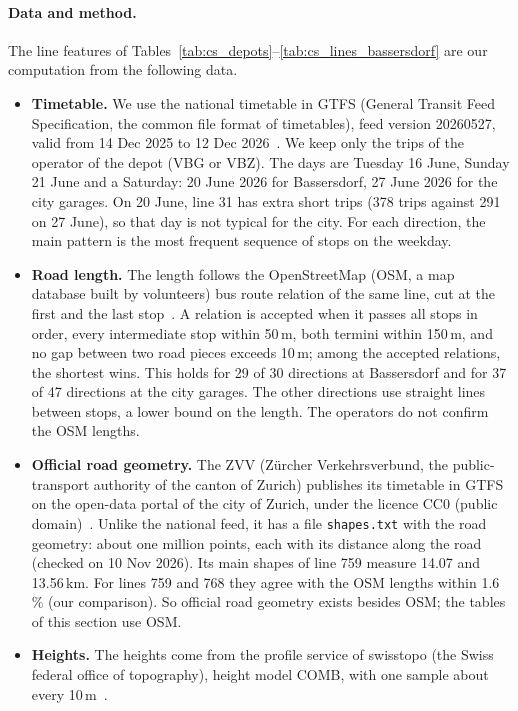 \documentclass[11pt,a4paper]{article}
\theoremstyle{plain}
\theoremstyle{definition}
\theoremstyle{remark}
\begin{document}
\paragraph{Data and method.}
The line features of Tables~\ref{tab:cs_depots}--\ref{tab:cs_lines_bassersdorf} are our computation from the following data.
\begin{itemize}
  \item \textbf{Timetable.} We use the national timetable in GTFS (General Transit Feed Specification, the common file format of timetables), feed version 20260527, valid from 14 Dec 2025 to 12 Dec 2026~\cite{SKI2026GTFS}.
    We keep only the trips of the operator of the depot (VBG or VBZ).
    The days are Tuesday 16 June, Sunday 21 June and a Saturday: 20 June 2026 for Bassersdorf, 27 June 2026 for the city garages.
    On 20 June, line 31 has extra short trips (378 trips against 291 on 27 June), so that day is not typical for the city.
    For each direction, the main pattern is the most frequent sequence of stops on the weekday.
  \item \textbf{Road length.} The length follows the OpenStreetMap (OSM, a map database built by volunteers) bus route relation of the same line, cut at the first and the last stop~\cite{OSM2026Routes}.
    A relation is accepted when it passes all stops in order, every intermediate stop within 50\,m, both termini within 150\,m, and no gap between two road pieces exceeds 10\,m; among the accepted relations, the shortest wins.
    This holds for 29 of 30 directions at Bassersdorf and for 37 of 47 directions at the city garages.
    The other directions use straight lines between stops, a lower bound on the length.
    The operators do not confirm the OSM lengths.
  \item \textbf{Official road geometry.} The ZVV (Z\"urcher Verkehrsverbund, the public-transport authority of the canton of Zurich) publishes its timetable in GTFS on the open-data portal of the city of Zurich, under the licence CC0 (public domain)~\cite{ZVV2026GTFS}.
    Unlike the national feed, it has a file \texttt{shapes.txt} with the road geometry: about one million points, each with its distance along the road (checked on 10 Nov 2026).
    Its main shapes of line 759 measure 14.07 and 13.56\,km.
    For lines 759 and 768 they agree with the OSM lengths within 1.6\,\% (our comparison).
    So official road geometry exists besides OSM; the tables of this section use OSM.
  \item \textbf{Heights.} The heights come from the profile service of swisstopo (the Swiss federal office of topography), height model COMB, with one sample about every 10\,m~\cite{Swisstopo2026Profile}.

\end{itemize}
\end{document}
